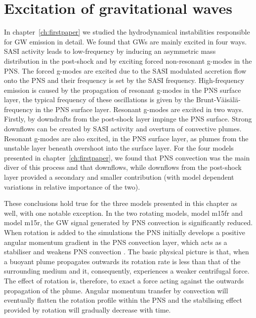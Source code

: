 \section{Excitation of gravitational waves}
In chapter~\ref{ch:firstpaper} we studied the hydrodynamical instabilities responsible for GW emission in detail.
We found that GWs are mainly excited in four ways. SASI activity leads to low-frequency by inducing an asymmetric mass distribution in the post-shock and by exciting forced non-resonant g-modes in the PNS. 
The forced g-modes are excited due to the  SASI modulated accretion flow onto the PNS 
and their frequency is set by the SASI frequency. High-frequency emission is caused by the propagation of
resonant g-modes in the PNS surface layer, the typical frequency of these oscillations is given by the
Brunt-V\"{a}is\"{a}l\"{a}-frequency in the PNS surface layer. Resonant g-modes are excited in two ways.
Firstly, by downdrafts from the post-shock layer impinge the PNS surface. Strong downflows can be created by SASI activity and overturn of convective plumes. Resonant g-modes are also excited, in the PNS surface layer,
as plumes from the unstable layer beneath overshoot into the surface layer.
For the four models presented in chapter~\ref{ch:firstpaper}, we found that PNS convection was the main diver
of this process and that downflows, while downflows from the post-shock layer provided a secondary and smaller
contribution (with model dependent variations in relative importance of the two).

These conclusions hold true for the three models presented in this chapter as well, with one notable
exception. In the two rotating models, model m15fr and model m15r, the GW signal generated by PNS convection 
is significantly reduced. When rotation is added to the simulations the PNS initially develops a positive
angular momentum gradient in the PNS convection layer, which acts as a stabiliser and weakens PNS
convection \citep{janka_01b}. 
The basic physical picture is that, when a buoyant plume propagates outwards its rotation rate
is less than that of the surrounding medium and it, consequently, experiences a weaker centrifugal force.
The effect of rotation is, therefore, to exact a force acting against the outwards propagation of the plume.
Angular momentum transfer by convection will eventually flatten the rotation profile within the PNS and 
the stabilising effect provided by rotation will gradually decrease with time.

